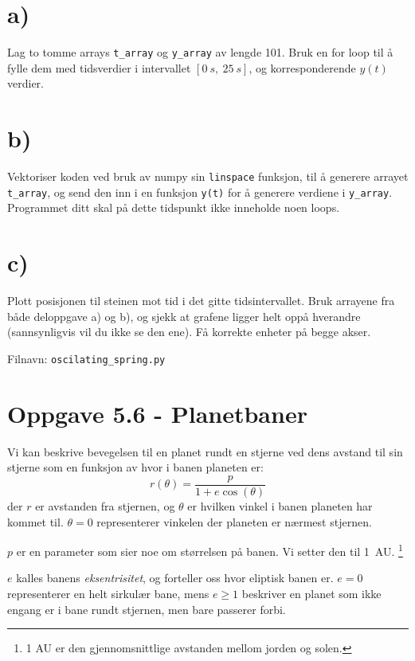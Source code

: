 \documentclass[10pt,a4paper]{article}
\begin{document}
\section*{a)}
Lag to tomme arrays \texttt{t\_array} og \texttt{y\_array} av lengde 101. Bruk en for loop til å fylle dem med tidsverdier i intervallet $[\SI{0}{s},\ \SI{25}{s}]$, og korresponderende $y(t)$ verdier.

\section*{b)}
Vektoriser koden ved bruk av numpy sin \texttt{linspace} funksjon, til å generere arrayet \texttt{t\_array}, og send den inn i en funksjon \texttt{y(t)} for å generere verdiene i \texttt{y\_array}. Programmet ditt skal på dette tidspunkt ikke inneholde noen loops.

\section*{c)}
Plott posisjonen til steinen mot tid i det gitte tidsintervallet. Bruk arrayene fra både deloppgave a) og b), og sjekk at grafene ligger helt oppå hverandre (sannsynligvis vil du ikke se den ene). Få korrekte enheter på begge akser.

Filnavn: \texttt{oscilating\_spring.py}





\section*{Oppgave 5.6 - Planetbaner}
Vi kan beskrive bevegelsen til en planet rundt en stjerne ved dens avstand til sin stjerne som en funksjon av hvor i banen planeten er:
\begin{equation}
r(\theta) = \frac{p}{1+e\cos(\theta)}	\label{eqn:radial_orbit}
\end{equation}
der $r$ er avstanden fra stjernen, og $\theta$ er hvilken vinkel i banen planeten har kommet til. $\theta = 0$ representerer vinkelen der planeten er nærmest stjernen.

$p$ er en parameter som sier noe om størrelsen på banen. Vi setter den til \SI{1}{AU}. \footnote{1 AU er den gjennomsnittlige avstanden mellom jorden og solen.}

$e$ kalles banens \textit{eksentrisitet}, og forteller oss hvor eliptisk banen er. $e = 0$ representerer en helt sirkulær bane, mens $e\geq 1$ beskriver en planet som ikke engang er i bane rundt stjernen, men bare passerer forbi.
\end{document}
